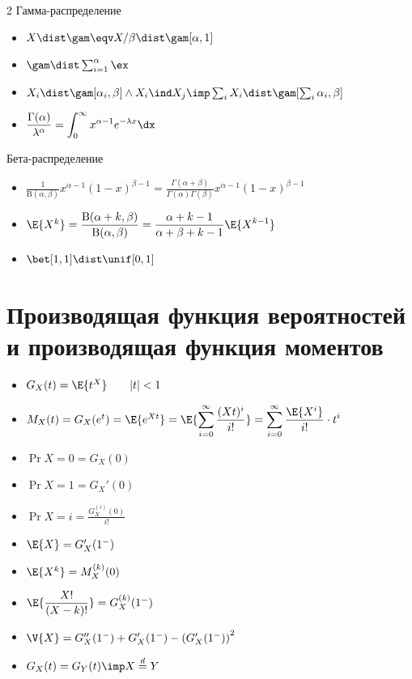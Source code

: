 \documentclass[landscape]{article}
\begin{document}
\begin{multicols*}{2}
Гамма-распределение
\begin{itemize}
  \item $X\dist\gam \eqv X/\beta \dist\gam[\alpha,1]$
  \item $\gam\dist \sum_{i=1}^\alpha\ex$
  \item $X_i\dist\gam[\alpha_i,\beta] \wedge X_i \ind X_j \imp
    \sum_i X_i\dist \gam[\sum_i \alpha_i,\beta]$
  \item $\displaystyle\frac{\Gamma(\alpha)}{\lambda^\alpha}
    = \displaystyle\int_0^\infty x^{\alpha-1} e^{-\lambda x} \dx$
\end{itemize}

Бета-распределение
\begin{itemize}
  \item $\displaystyle
    \frac{1}{\text{B}(\alpha,\beta)}x^{\alpha-1}(1-x)^{\beta-1}
    = \frac{\Gamma(\alpha+\beta)}{\Gamma(\alpha)\Gamma(\beta)}
    x^{\alpha-1}(1-x)^{\beta-1} $
  \item $\E{X^k}
    = \displaystyle\frac{\text{B}(\alpha+k,\beta)}{\text{B}(\alpha,\beta)}
    = \displaystyle\frac{\alpha+k-1}{\alpha+\beta+k-1}\E{X^{k-1}}$
  \item $\bet[1,1] \dist \unif[0,1]$
\end{itemize}

\section{Производящая функция вероятностей и производящая функция моментов}

\begin{itemize}
  \item $G_X(t) = \E{t^X} \qquad |t| < 1$
  \item $M_X(t) = G_X(e^t) = \E{e^{Xt}}
    = \E{ \displaystyle\sum_{i=0}^\infty \frac{(Xt)^i}{i!}}
    = \displaystyle\sum_{i=0}^\infty \frac{\E{X^i}}{i!}\cdot t^i$
  \item $\Pr{X=0} = G_X(0)$
  \item $\Pr{X=1}=G_X'(0)$
  \item $\Pr{X=i} = \displaystyle\frac{G_X^{(i)}(0)}{i!}$
  \item $\E{X} = G_X'(1^-)$
  \item $\E{X^k} = M_X^{(k)}(0)$
  \item $\E{\displaystyle\frac{X!}{(X-k)!}} = G_X^{(k)}(1^-)$
  \item $\V{X} = G_X''(1^-) + G_X'(1^-)
    - \left(G_X'(1^-)\right)^2$
  \item $G_X(t) = G_Y(t) \imp X \stackrel{d}{=} Y$
\end{itemize}


\end{multicols*}
\end{document}
